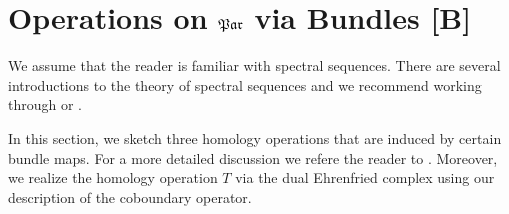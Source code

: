 \section{Operations on \texorpdfstring{$\mathfrak{Par}$}{Par} via Bundles [B]}
\label{homology_operations:operations_par_via_bundles}
We assume that the reader is familiar with spectral sequences.
There are several introductions to the theory of spectral sequences and we recommend working through \cite[Chapter 5]{Weibel1995} or \cite[Chapter 9]{Spanier199412}.

In this section, we sketch three homology operations that are induced by certain bundle maps.
For a more detailed discussion we refere the reader to \cite[Chapter 4]{Mehner201112}.
Moreover, we realize the homology operation $T$ via the dual Ehrenfried complex using our description of the coboundary operator.

